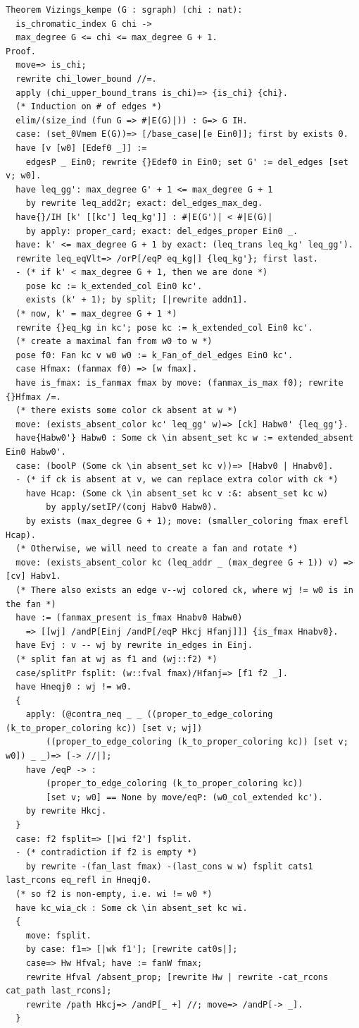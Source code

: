 \begin{verbatim}
Theorem Vizings_kempe (G : sgraph) (chi : nat): 
  is_chromatic_index G chi -> 
  max_degree G <= chi <= max_degree G + 1.
Proof.
  move=> is_chi; 
  rewrite chi_lower_bound //=.
  apply (chi_upper_bound_trans is_chi)=> {is_chi} {chi}.
  (* Induction on # of edges *)
  elim/(size_ind (fun G => #|E(G)|)) : G=> G IH.
  case: (set_0Vmem E(G))=> [/base_case|[e Ein0]]; first by exists 0.
  have [v [w0] [Edef0 _]] := 
    edgesP _ Ein0; rewrite {}Edef0 in Ein0; set G' := del_edges [set v; w0].
  have leq_gg': max_degree G' + 1 <= max_degree G + 1 
    by rewrite leq_add2r; exact: del_edges_max_deg. 
  have{}/IH [k' [[kc'] leq_kg']] : #|E(G')| < #|E(G)| 
    by apply: proper_card; exact: del_edges_proper Ein0 _.
  have: k' <= max_degree G + 1 by exact: (leq_trans leq_kg' leq_gg').
  rewrite leq_eqVlt=> /orP[/eqP eq_kg|] {leq_kg'}; first last.
  - (* if k' < max_degree G + 1, then we are done *) 
    pose kc := k_extended_col Ein0 kc'.
    exists (k' + 1); by split; [|rewrite addn1].
  (* now, k' = max_degree G + 1 *)
  rewrite {}eq_kg in kc'; pose kc := k_extended_col Ein0 kc'.
  (* create a maximal fan from w0 to w *)
  pose f0: Fan kc v w0 w0 := k_Fan_of_del_edges Ein0 kc'.
  case Hfmax: (fanmax f0) => [w fmax].
  have is_fmax: is_fanmax fmax by move: (fanmax_is_max f0); rewrite {}Hfmax /=.
  (* there exists some color ck absent at w *)
  move: (exists_absent_color kc' leq_gg' w)=> [ck] Habw0' {leq_gg'}.
  have{Habw0'} Habw0 : Some ck \in absent_set kc w := extended_absent Ein0 Habw0'.
  case: (boolP (Some ck \in absent_set kc v))=> [Habv0 | Hnabv0].
  - (* if ck is absent at v, we can replace extra color with ck *)
    have Hcap: (Some ck \in absent_set kc v :&: absent_set kc w) 
        by apply/setIP/(conj Habv0 Habw0).
    by exists (max_degree G + 1); move: (smaller_coloring fmax erefl Hcap).
  (* Otherwise, we will need to create a fan and rotate *)
  move: (exists_absent_color kc (leq_addr _ (max_degree G + 1)) v) => [cv] Habv1. 
  (* There also exists an edge v--wj colored ck, where wj != w0 is in the fan *)
  have := (fanmax_present is_fmax Hnabv0 Habw0)
    => [[wj] /andP[Einj /andP[/eqP Hkcj Hfanj]]] {is_fmax Hnabv0}.
  have Evj : v -- wj by rewrite in_edges in Einj.
  (* split fan at wj as f1 and (wj::f2) *)
  case/splitPr fsplit: (w::fval fmax)/Hfanj=> [f1 f2 _].
  have Hneqj0 : wj != w0.
  { 
    apply: (@contra_neq _ _ ((proper_to_edge_coloring (k_to_proper_coloring kc)) [set v; wj]) 
        ((proper_to_edge_coloring (k_to_proper_coloring kc)) [set v; w0]) _ _)=> [-> //|];
    have /eqP -> : 
        (proper_to_edge_coloring (k_to_proper_coloring kc)) 
        [set v; w0] == None by move/eqP: (w0_col_extended kc').
    by rewrite Hkcj.
  }
  case: f2 fsplit=> [|wi f2'] fsplit.
  - (* contradiction if f2 is empty *)
    by rewrite -(fan_last fmax) -(last_cons w w) fsplit cats1 last_rcons eq_refl in Hneqj0.
  (* so f2 is non-empty, i.e. wi != w0 *)
  have kc_wia_ck : Some ck \in absent_set kc wi.
  { 
    move: fsplit. 
    by case: f1=> [|wk f1']; [rewrite cat0s|]; 
    case=> Hw Hfval; have := fanW fmax;
    rewrite Hfval /absent_prop; [rewrite Hw | rewrite -cat_rcons cat_path last_rcons];
    rewrite /path Hkcj=> /andP[_ +] //; move=> /andP[-> _]. 
  }


\end{verbatim}
